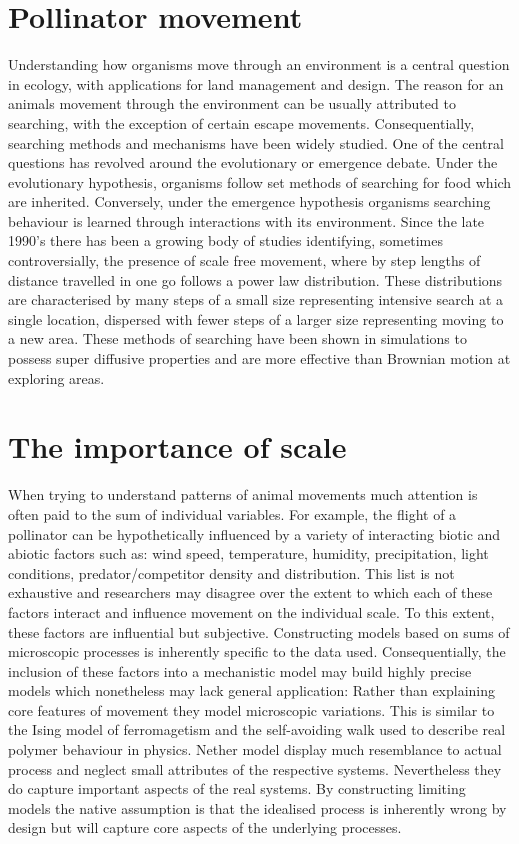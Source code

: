 \documentclass[11pt,usenames,dvipsnames]{article}
\begin{document}
\section{Pollinator movement}
Understanding how organisms move through an environment is a central question in ecology, with applications for land management and design. The reason for an animals movement through the environment can be usually attributed to searching, with the exception of certain escape movements. Consequentially, searching methods and mechanisms have been widely studied. One of the central questions has revolved around the evolutionary or emergence debate. Under the evolutionary hypothesis, organisms follow set methods of searching for food which are inherited. Conversely, under the emergence hypothesis organisms searching behaviour is learned through interactions with its environment. Since the late 1990's there has been a growing body of studies identifying, sometimes controversially, the presence of scale free movement, where by step lengths of distance travelled in one go follows a power law distribution. These distributions are characterised by many steps of a small size representing intensive search at a single location, dispersed with fewer steps of a larger size representing moving to a new area. These methods of searching have been shown in simulations to possess super diffusive properties and are more effective than Brownian motion at exploring areas. 



\section{The importance of scale}
When trying to understand patterns of animal movements much attention is often paid to the sum of individual variables. For example, the flight of a pollinator can be hypothetically influenced by a variety of interacting biotic and abiotic factors such as: wind speed, temperature, humidity, precipitation, light conditions, predator/competitor density and distribution. This list is not exhaustive and researchers may disagree over the extent to which each of these factors interact and influence movement on the individual scale. To this extent, these factors are influential but subjective. Constructing models based on sums of microscopic processes is inherently specific to the data used. Consequentially, the inclusion of these factors into a mechanistic model may build highly precise models which nonetheless may lack general application: Rather than explaining core features of movement they model microscopic variations. This is similar to the Ising model of ferromagetism and the self-avoiding walk used to describe real polymer behaviour in physics. Nether model display much resemblance to actual process and neglect small attributes of the respective systems. Nevertheless they do capture important aspects of the real systems. By constructing limiting models the native assumption is that the idealised process is inherently wrong by design but will capture core aspects of the underlying processes.  
\end{document}
